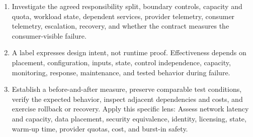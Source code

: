 \documentclass[11pt]{article}
\begin{document}
\begin{enumerate}
\item Investigate the agreed responsibility split, boundary controls, capacity and quota, workload state, dependent services, provider telemetry, consumer telemetry, escalation, recovery, and whether the contract measures the consumer-visible failure.
\item A label expresses design intent, not runtime proof. Effectiveness depends on placement, configuration, inputs, state, control independence, capacity, monitoring, response, maintenance, and tested behavior during failure.
\item Establish a before-and-after measure, preserve comparable test conditions, verify the expected behavior, inspect adjacent dependencies and costs, and exercise rollback or recovery. Apply this specific lens: Assess network latency and capacity, data placement, security equivalence, identity, licensing, state, warm-up time, provider quotas, cost, and burst-in safety.
\end{enumerate}
\end{document}
